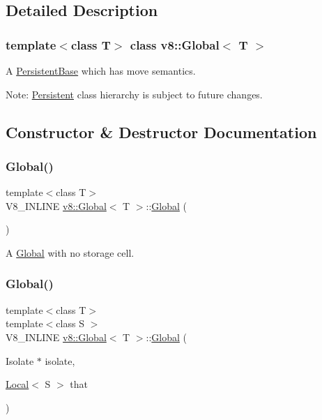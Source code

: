 \subsection{Detailed Description}
\subsubsection*{template$<$class T$>$\newline
class v8\+::\+Global$<$ T $>$}

A \mbox{\hyperlink{classv8_1_1PersistentBase}{Persistent\+Base}} which has move semantics.

Note\+: \mbox{\hyperlink{classv8_1_1Persistent}{Persistent}} class hierarchy is subject to future changes. 

\subsection{Constructor \& Destructor Documentation}
\mbox{\label{classv8_1_1Global_ab1efdf25ff6305e67f3266a6fe90527e}} 
\subsubsection{\texorpdfstring{Global()}{Global()}\hspace{0.1cm}{\footnotesize\ttfamily [1/4]}}
{\footnotesize\ttfamily template$<$class T$>$ \\
V8\+\_\+\+I\+N\+L\+I\+NE \mbox{\hyperlink{classv8_1_1Global}{v8\+::\+Global}}$<$ T $>$\+::\mbox{\hyperlink{classv8_1_1Global}{Global}} (\begin{DoxyParamCaption}{ }\end{DoxyParamCaption})\hspace{0.3cm}{\ttfamily [inline]}}

A \mbox{\hyperlink{classv8_1_1Global}{Global}} with no storage cell. \mbox{\label{classv8_1_1Global_a8434bb6729eb4cd0cd85ad81bd8344ad}} 
\subsubsection{\texorpdfstring{Global()}{Global()}\hspace{0.1cm}{\footnotesize\ttfamily [2/4]}}
{\footnotesize\ttfamily template$<$class T$>$ \\
template$<$class S $>$ \\
V8\+\_\+\+I\+N\+L\+I\+NE \mbox{\hyperlink{classv8_1_1Global}{v8\+::\+Global}}$<$ T $>$\+::\mbox{\hyperlink{classv8_1_1Global}{Global}} (\begin{DoxyParamCaption}\item[{Isolate $\ast$}]{isolate,  }\item[{\mbox{\hyperlink{classv8_1_1Local}{Local}}$<$ S $>$}]{that }\end{DoxyParamCaption})\hspace{0.3cm}{\ttfamily [inline]}}

